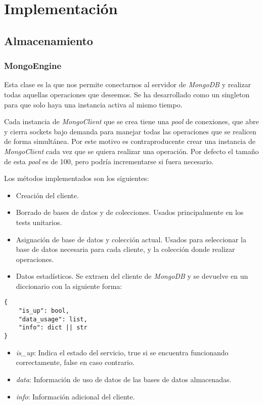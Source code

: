 \chapter{Implementación}



\section{Almacenamiento}

\subsection{MongoEngine}
\label{sec:mongoengine}

Esta clase es la que nos permite conectarnos al servidor de \textit{MongoDB} y realizar todas aquellas operaciones que deseemos. Se ha desarrollado como un singleton para que solo haya una instancia activa al mismo tiempo.

Cada instancia de \textit{MongoClient} que se crea tiene una \textit{pool} de conexiones, que abre y cierra sockets bajo demanda para manejar todas las operaciones que se realicen de forma simultánea. Por este motivo es contraproducente crear una instancia de \textit{MongoClient} cada vez que se quiera realizar una operación. Por defecto el tamaño de esta \textit{pool} es de 100, pero podría incrementarse si fuera necesario.

\bigskip
Los métodos implementados son los siguientes:
\begin{itemize}
	\item Creación del cliente.
	\item Borrado de bases de datos y de colecciones. Usados principalmente en los tests unitarios.
	\item Asignación de base de datos y colección actual. Usados para seleccionar la base de datos necesaria para cada cliente, y la colección donde realizar operaciones.
	\item Datos estadísticos. Se extraen del cliente de \textit{MongoDB} y se devuelve en un diccionario con la siguiente forma:
\end{itemize}

\pagebreak
\begin{lstlisting}
{
	"is_up": bool,
	"data_usage": list,
	"info": dict || str
}
\end{lstlisting}

\begin{itemize}
	\item \textit{is\_up}: Indica el estado del servicio, true si se encuentra funcionando correctamente, false en caso contrario.
	\item \textit{data}: Información de uso de datos de las bases de datos almacenadas.
	\item \textit{info}: Información adicional del cliente.
\end{itemize}



